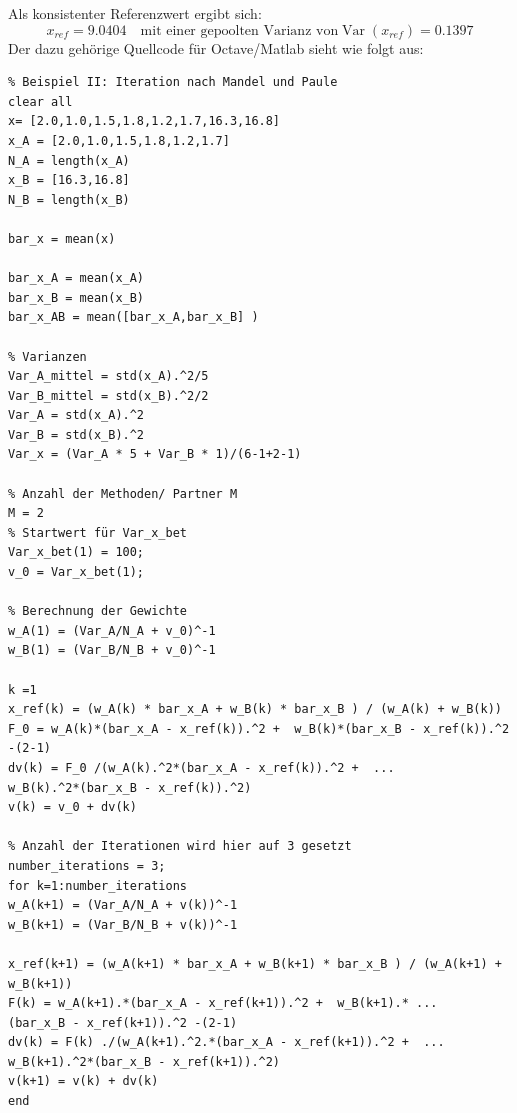 Als konsistenter Referenzwert ergibt sich:
\begin{equation}
x_{ref} = 9.0404 \quad \text{mit einer gepoolten Varianz von} 
\operatorname{Var}(x_{ref}) = 0.1397
\end{equation}
\newpage
Der dazu gehörige Quellcode für Octave/Matlab sieht wie folgt aus: 
\begin{verbatim}
% Beispiel II: Iteration nach Mandel und Paule
clear all
x= [2.0,1.0,1.5,1.8,1.2,1.7,16.3,16.8]
x_A = [2.0,1.0,1.5,1.8,1.2,1.7]
N_A = length(x_A)
x_B = [16.3,16.8]
N_B = length(x_B)

bar_x = mean(x)

bar_x_A = mean(x_A)
bar_x_B = mean(x_B)
bar_x_AB = mean([bar_x_A,bar_x_B] )

% Varianzen
Var_A_mittel = std(x_A).^2/5
Var_B_mittel = std(x_B).^2/2
Var_A = std(x_A).^2
Var_B = std(x_B).^2
Var_x = (Var_A * 5 + Var_B * 1)/(6-1+2-1)

% Anzahl der Methoden/ Partner M
M = 2
% Startwert für Var_x_bet
Var_x_bet(1) = 100;
v_0 = Var_x_bet(1);

% Berechnung der Gewichte
w_A(1) = (Var_A/N_A + v_0)^-1
w_B(1) = (Var_B/N_B + v_0)^-1

k =1
x_ref(k) = (w_A(k) * bar_x_A + w_B(k) * bar_x_B ) / (w_A(k) + w_B(k))
F_0 = w_A(k)*(bar_x_A - x_ref(k)).^2 +  w_B(k)*(bar_x_B - x_ref(k)).^2 -(2-1)
dv(k) = F_0 /(w_A(k).^2*(bar_x_A - x_ref(k)).^2 +  ...
w_B(k).^2*(bar_x_B - x_ref(k)).^2)
v(k) = v_0 + dv(k)

% Anzahl der Iterationen wird hier auf 3 gesetzt
number_iterations = 3;
for k=1:number_iterations
w_A(k+1) = (Var_A/N_A + v(k))^-1
w_B(k+1) = (Var_B/N_B + v(k))^-1

x_ref(k+1) = (w_A(k+1) * bar_x_A + w_B(k+1) * bar_x_B ) / (w_A(k+1) + w_B(k+1))
F(k) = w_A(k+1).*(bar_x_A - x_ref(k+1)).^2 +  w_B(k+1).* ...
(bar_x_B - x_ref(k+1)).^2 -(2-1)
dv(k) = F(k) ./(w_A(k+1).^2.*(bar_x_A - x_ref(k+1)).^2 +  ...
w_B(k+1).^2*(bar_x_B - x_ref(k+1)).^2)
v(k+1) = v(k) + dv(k)
end
\end{verbatim}


